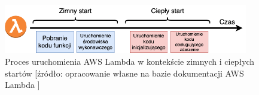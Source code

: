 \begin{figure}[h]
    \centering
    \includegraphics[width=0.95\textwidth]{charts/warm_cold_starts_lambda.png}
    \caption{Proces uruchomienia AWS Lambda w kontekście zimnych i ciepłych startów [źródło: opracowanie własne na bazie dokumentacji AWS Lambda \cite{awsLambdaDocs}]}
    \label{fig:aws_lambda_warm_cold_starts}    
\end{figure}

    


